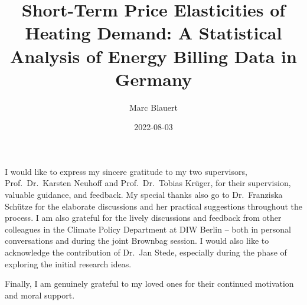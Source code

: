 \documentclass[12pt,twoside]{reedthesis}
\title{Short-Term Price Elasticities of Heating Demand: A Statistical Analysis of Energy Billing Data in Germany}
\author{Marc Blauert}
\date{2022-08-03}
\begin{document}
  \maketitle

\frontmatter %
\pagestyle{empty} %
  \begin{acknowledgements}
    I would like to express my sincere gratitude to my two supervisors, Prof.~Dr.~Karsten Neuhoff and Prof.~Dr.~Tobias Krüger, for their supervision, valuable guidance, and feedback. My special thanks also go to Dr.~Franziska Schütze for the elaborate discussions and her practical suggestions throughout the process. I am also grateful for the lively discussions and feedback from other colleagues in the Climate Policy Department at DIW Berlin -- both in personal conversations and during the joint Brownbag session. I would also like to acknowledge the contribution of Dr.~Jan Stede, especially during the phase of exploring the initial research ideas.

    \par
    \bigskip

    Finally, I am genuinely grateful to my loved ones for their continued motivation and moral support.
  \end{acknowledgements}

  \hypersetup{linkcolor=black}
  \setcounter{secnumdepth}{2}
  \setcounter{tocdepth}{2}
  \tableofcontents

  \listoftables
\end{document}
